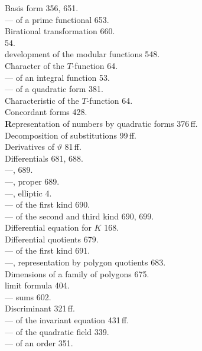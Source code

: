 \begin{minipage}[t]{0.48\textwidth}
\noindent
Basis form 356, 651. \\
--- of a prime functional 653. \\
Birational transformation 660. \\[4pt]
 54. \\
 development of the modular functions 548. \\
Character of the $T$-function 64. \\
--- of an integral function 53. \\
--- of a quadratic form 381. \\
Characteristic of the $T$-function 64. \\
Concordant forms 428. \\[4pt]
\textbf{R}epresentation of numbers by quadratic forms 376\,ff. \\
Decomposition of substitutions 99\,ff. \\
Derivatives of $\vartheta$ 81\,ff. \\
Differentials 681, 688. \\
---,  689. \\
---, proper 689. \\
---, elliptic 4. \\
--- of the first kind 690. \\
--- of the second and third kind 690, 699. \\
Differential equation for $K$ 168. \\
Differential quotients 679. \\
--- of the first kind 691. \\
---, representation by polygon quotients 683. \\
Dimensions of a family of polygons 675. \\
 limit formula 404. \\
--- sums 602. \\
Discriminant 321\,ff. \\
--- of the invariant equation 431\,ff. \\
--- of the quadratic field 339. \\
--- of an order 351.
\end{minipage}
